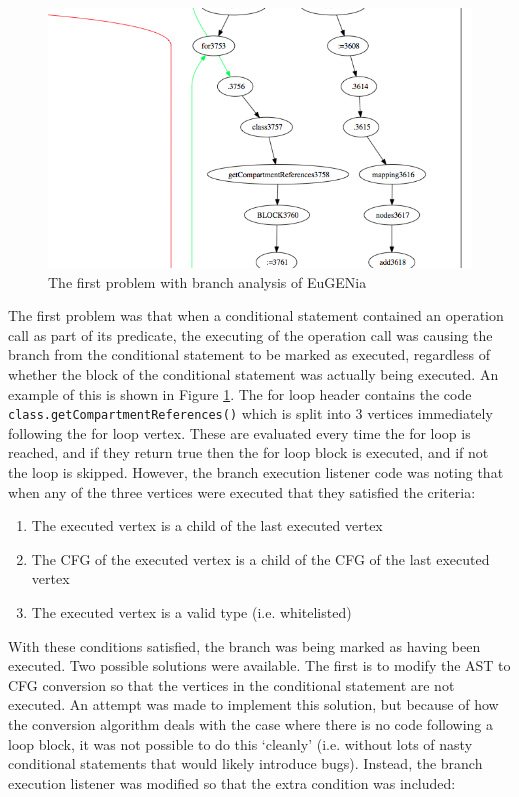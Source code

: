 \begin{figure}
\centering
\includegraphics[scale=0.3]{figures/caseStudyProblem1}
\caption{The first problem with branch analysis of EuGENia}
\label{fig:caseStudyProblem1}
\end{figure}

The first problem was that when a conditional statement contained an operation call as part of its predicate, the executing of the operation call was causing the branch from the conditional statement to be marked as executed, regardless of whether the block of the conditional statement was actually being executed. An example of this is shown in Figure \ref{fig:caseStudyProblem1}. The for loop header contains the code \verb|class.getCompartmentReferences()| which is split into 3 vertices immediately following the for loop vertex. These are evaluated every time the for loop is reached, and if they return true then the for loop block is executed, and if not the loop is skipped. However, the branch execution listener code was noting that when any of the three vertices were executed that they satisfied the criteria:

\begin{enumerate}
\item The executed vertex is a child of the last executed vertex
\item The CFG of the executed vertex is a child of the CFG of the last executed vertex
\item The executed vertex is a valid type (i.e. whitelisted)
\end{enumerate}

With these conditions satisfied, the branch was being marked as having been executed. Two possible solutions were available. The first is to modify the AST to CFG conversion so that the vertices in the conditional statement are not executed. An attempt was made to implement this solution, but because of how the conversion algorithm deals with the case where there is no code following a loop block, it was not possible to do this `cleanly' (i.e. without lots of nasty conditional statements that would likely introduce bugs). Instead, the branch execution listener was modified so that the extra condition was included:


